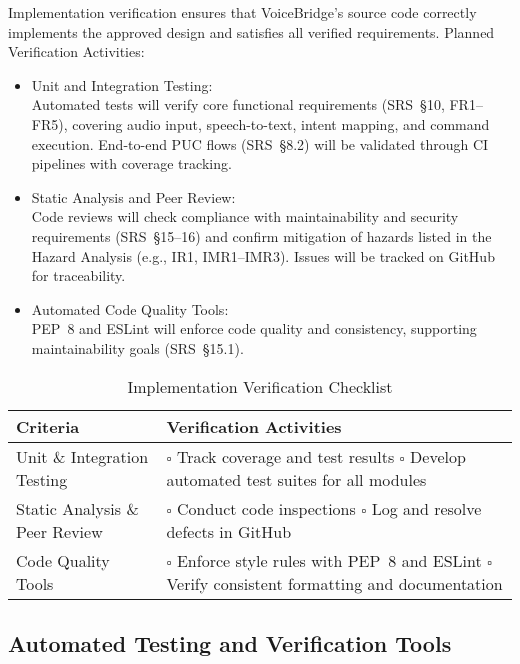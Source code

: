\documentclass[12pt, titlepage]{article}
\begin{document}
Implementation verification ensures that VoiceBridge’s source code correctly implements the approved design and satisfies all verified requirements. Planned Verification Activities:

\begin{itemize}
    \item Unit and Integration Testing: \\
    Automated tests will verify core functional requirements (SRS~§10, FR1--FR5), covering audio input, speech-to-text, intent mapping, and command execution. End-to-end PUC flows (SRS~§8.2) will be validated through CI pipelines with coverage tracking.

    \item Static Analysis and Peer Review: \\
    Code reviews will check compliance with maintainability and security requirements (SRS~§15--16) and confirm mitigation of hazards listed in the Hazard Analysis (e.g., IR1, IMR1--IMR3). Issues will be tracked on GitHub for traceability.

    \item Automated Code Quality Tools: \\
    PEP~8 and ESLint will enforce code quality and consistency, supporting maintainability goals (SRS~§15.1).
\end{itemize}

\begin{table}[H]
\centering
\caption{Implementation Verification Checklist}
\renewcommand{\arraystretch}{1.3}
\begin{tabular}{|p{6cm}|p{8cm}|}
\hline
Criteria & Verification Activities \\ \hline
Unit \& Integration Testing &
\(\square\) Track coverage and test results \newline
\(\square\) Develop automated test suites for all modules \\ \hline
Static Analysis \& Peer Review &
\(\square\) Conduct code inspections \newline
\(\square\) Log and resolve defects in GitHub \\ \hline
Code Quality Tools &
\(\square\) Enforce style rules with PEP~8 and ESLint \newline
\(\square\) Verify consistent formatting and documentation \\ \hline
\end{tabular}
\end{table}


\subsection{Automated Testing and Verification Tools}
\end{document}
